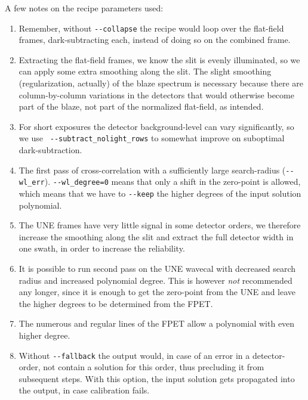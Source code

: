 A few notes on the recipe parameters used:
\begin{enumerate}
  \item[2.] Remember, without \verb!--collapse! the recipe would loop over the
  flat-field frames, dark-subtracting each, instead of doing so on the combined
  frame.
  \item[5.] Extracting the flat-field frames, we know the slit is evenly
  illuminated, so we can apply some extra smoothing along the slit. The slight
  smoothing (regularization, actually) of the blaze spectrum is necessary
  because there are column-by-column variations in the detectors that would
  otherwise become part of the blaze, not part of the normalized flat-field, as
  intended.
  \item[7.] For short exposures the detector background-level can vary
  significantly, so we use \linebreak \verb! --subtract_nolight_rows! to
  somewhat improve on suboptimal dark-subtraction.
  \item[9.] The first pass of cross-correlation with a sufficiently large
  search-radius (\verb!--wl_err!). \verb!--wl_degree=0! means that only a shift
  in the zero-point is allowed, which means that we have to \verb!--keep! the
  higher degrees of the input solution polynomial.
  \item[11.] The UNE frames have very little signal in some detector orders, we
  therefore increase the smoothing along the slit and extract the full detector
  width in one swath, in order to increase the reliability.
  \item[12.] It is possible to run second pass on the UNE wavecal with decreased
  search radius and increased polynomial degree. This is however \emph{not}
  recommended any longer, since it is enough to get the zero-point from the UNE
  and leave the higher degrees to be determined from the FPET.
  \item[15.] The numerous and regular lines of the FPET allow a polynomial with
  even higher degree.
  \item[9,11,15.] Without \verb!--fallback! the output would, in case of an
  error in a detector-order, not contain a solution for this order, thus
  precluding it from subsequent steps. With this option, the input solution gets
  propagated into the output, in case calibration fails.
\end{enumerate}
